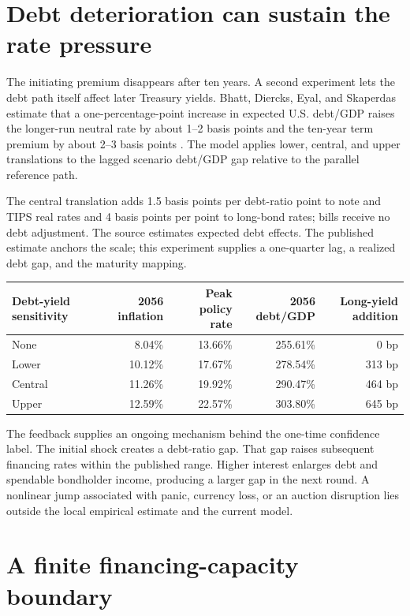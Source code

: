 \documentclass[11pt]{article}
\begin{document}
\section{Debt deterioration can sustain the rate pressure}

The initiating premium disappears after ten years.  A second experiment lets the debt path
itself affect later Treasury yields.  Bhatt, Diercks, Eyal, and Skaperdas estimate that a
one-percentage-point increase in expected U.S. debt/GDP raises the longer-run neutral rate by
about 1--2 basis points and the ten-year term premium by about 2--3 basis points
\cite{fedDebtRates}.  The model applies lower, central, and upper translations to the lagged
scenario debt/GDP gap relative to the parallel reference path.

The central translation adds 1.5 basis points per debt-ratio point to note and TIPS real
rates and 4 basis points per point to long-bond rates; bills receive no debt adjustment.  The
source estimates expected debt effects.  The published estimate anchors the scale; this
experiment supplies a one-quarter lag, a realized debt gap, and the maturity mapping.

\begin{center}
\begin{tabular}{lrrrr}
\toprule
Debt-yield sensitivity & 2056 inflation & Peak policy rate & 2056 debt/GDP & Long-yield addition \\
\midrule
None    & 8.04\%  & 13.66\% & 255.61\% & 0 bp \\
Lower   & 10.12\% & 17.67\% & 278.54\% & 313 bp \\
Central & 11.26\% & 19.92\% & 290.47\% & 464 bp \\
Upper   & 12.59\% & 22.57\% & 303.80\% & 645 bp \\
\bottomrule
\end{tabular}
\end{center}

The feedback supplies an ongoing mechanism behind the one-time confidence label.  The
initial shock creates a debt-ratio gap.  That gap raises subsequent financing rates within the
published range.  Higher interest enlarges debt and spendable bondholder income, producing a
larger gap in the next round.  A nonlinear jump associated with panic, currency loss, or an
auction disruption lies outside the local empirical estimate and the current model.

\section{A finite financing-capacity boundary}
\end{document}
